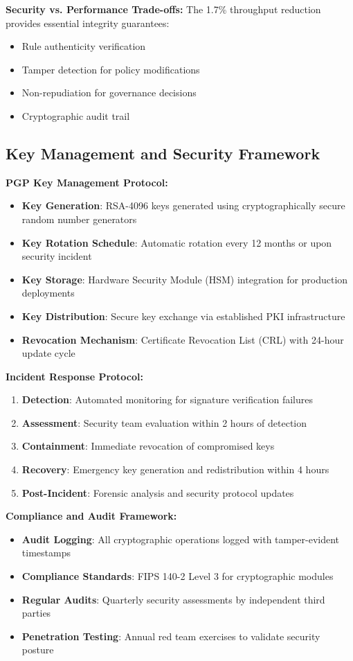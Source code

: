 \documentclass[sigconf,natbib]{acmart}
\begin{document}
\textbf{Security vs. Performance Trade-offs:}
The 1.7\% throughput reduction provides essential integrity guarantees:
\begin{itemize}
    \item Rule authenticity verification
    \item Tamper detection for policy modifications
    \item Non-repudiation for governance decisions
    \item Cryptographic audit trail
\end{itemize}

\subsection{Key Management and Security Framework}
\label{app:key_management}

\textbf{PGP Key Management Protocol:}
\begin{itemize}
    \item \textbf{Key Generation}: RSA-4096 keys generated using cryptographically secure random number generators
    \item \textbf{Key Rotation Schedule}: Automatic rotation every 12 months or upon security incident
    \item \textbf{Key Storage}: Hardware Security Module (HSM) integration for production deployments
    \item \textbf{Key Distribution}: Secure key exchange via established PKI infrastructure
    \item \textbf{Revocation Mechanism}: Certificate Revocation List (CRL) with 24-hour update cycle
\end{itemize}

\textbf{Incident Response Protocol:}
\begin{enumerate}
    \item \textbf{Detection}: Automated monitoring for signature verification failures
    \item \textbf{Assessment}: Security team evaluation within 2 hours of detection
    \item \textbf{Containment}: Immediate revocation of compromised keys
    \item \textbf{Recovery}: Emergency key generation and redistribution within 4 hours
    \item \textbf{Post-Incident}: Forensic analysis and security protocol updates
\end{enumerate}

\textbf{Compliance and Audit Framework:}
\begin{itemize}
    \item \textbf{Audit Logging}: All cryptographic operations logged with tamper-evident timestamps
    \item \textbf{Compliance Standards}: FIPS 140-2 Level 3 for cryptographic modules
    \item \textbf{Regular Audits}: Quarterly security assessments by independent third parties
    \item \textbf{Penetration Testing}: Annual red team exercises to validate security posture
\end{itemize}
\end{document}
